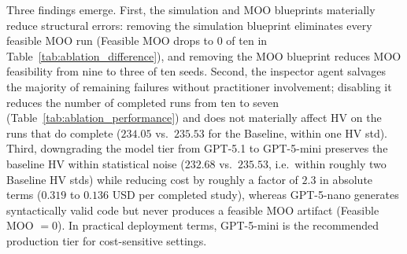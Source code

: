 \documentclass[a4paper,fleqn]{cas-sc}
\begin{document}
  Three findings emerge. First, the simulation and MOO blueprints                                                                           
  materially reduce structural errors: removing the simulation blueprint                                                                    
  eliminates every feasible MOO run (Feasible MOO drops to $0$ of ten in                                                                    
  Table~\ref{tab:ablation_difference}), and removing the MOO blueprint                                                                      
  reduces MOO feasibility from nine to three of ten seeds. Second, the                                                                      
  inspector agent salvages the majority of remaining failures without                                                                       
  practitioner involvement; disabling it reduces the number of completed                                                                    
  runs from ten to seven (Table~\ref{tab:ablation_performance}) and does                                                                    
  not materially affect HV on the runs that do complete                                                                                     
  ($234.05$ vs.\ $235.53$ for the Baseline, within one HV std).                                                                             
  Third, downgrading the model tier from GPT-5.1 to GPT-5-mini preserves                                                                    
  the baseline HV within statistical noise ($232.68$ vs.\ $235.53$,                                                                         
  i.e.\ within roughly two Baseline HV stds) while reducing cost by roughly                                                                 
  a factor of $2.3$ in absolute terms ($0.319$ to $0.136$ USD per completed                                                                 
  study), whereas GPT-5-nano generates syntactically valid code but never                                                                   
  produces a feasible MOO artifact (Feasible MOO $= 0$). In practical                                                                       
  deployment terms, GPT-5-mini is the recommended production tier for                                                                       
  cost-sensitive settings.                                                                                                                  
                                                                                                            
\end{document}
